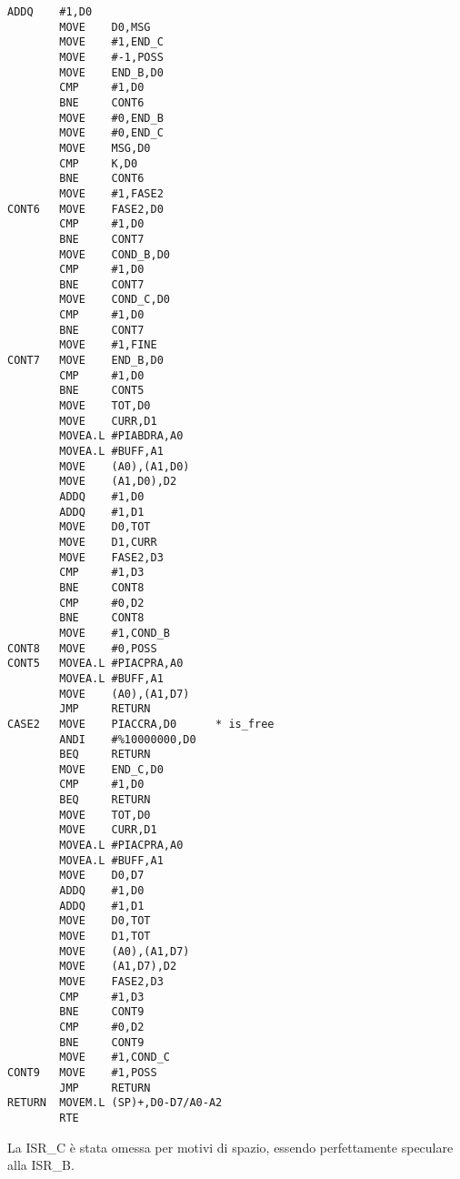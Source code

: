 \documentclass{article}
\begin{document}
\begin{lstlisting}[language=RISCAsm]
        ADDQ    #1,D0  
        MOVE    D0,MSG 
        MOVE    #1,END_C 
        MOVE    #-1,POSS 
        MOVE    END_B,D0 
        CMP     #1,D0 
        BNE     CONT6
        MOVE    #0,END_B
        MOVE    #0,END_C 
        MOVE    MSG,D0 
        CMP     K,D0
        BNE     CONT6
        MOVE    #1,FASE2 
CONT6   MOVE    FASE2,D0 
        CMP     #1,D0 
        BNE     CONT7
        MOVE    COND_B,D0 
        CMP     #1,D0 
        BNE     CONT7 
        MOVE    COND_C,D0 
        CMP     #1,D0 
        BNE     CONT7 
        MOVE    #1,FINE 
CONT7   MOVE    END_B,D0 
        CMP     #1,D0 
        BNE     CONT5 
        MOVE    TOT,D0 
        MOVE    CURR,D1 
        MOVEA.L #PIABDRA,A0
        MOVEA.L #BUFF,A1 
        MOVE    (A0),(A1,D0)
        MOVE    (A1,D0),D2
        ADDQ    #1,D0 
        ADDQ    #1,D1 
        MOVE    D0,TOT 
        MOVE    D1,CURR 
        MOVE    FASE2,D3 
        CMP     #1,D3
        BNE     CONT8 
        CMP     #0,D2 
        BNE     CONT8 
        MOVE    #1,COND_B 
CONT8   MOVE    #0,POSS 
CONT5   MOVEA.L #PIACPRA,A0 
        MOVEA.L #BUFF,A1 
        MOVE    (A0),(A1,D7)
        JMP     RETURN 
CASE2   MOVE    PIACCRA,D0      * is_free 
        ANDI    #%10000000,D0   
        BEQ     RETURN 
        MOVE    END_C,D0 
        CMP     #1,D0 
        BEQ     RETURN 
        MOVE    TOT,D0 
        MOVE    CURR,D1 
        MOVEA.L #PIACPRA,A0
        MOVEA.L #BUFF,A1 
        MOVE    D0,D7 
        ADDQ    #1,D0 
        ADDQ    #1,D1 
        MOVE    D0,TOT 
        MOVE    D1,TOT 
        MOVE    (A0),(A1,D7)
        MOVE    (A1,D7),D2 
        MOVE    FASE2,D3 
        CMP     #1,D3 
        BNE     CONT9
        CMP     #0,D2 
        BNE     CONT9
        MOVE    #1,COND_C
CONT9   MOVE    #1,POSS 
        JMP     RETURN 
RETURN  MOVEM.L (SP)+,D0-D7/A0-A2
        RTE 
\end{lstlisting}
\vspace{1\baselineskip}
La ISR\_C è stata omessa per motivi di spazio, essendo perfettamente speculare alla ISR\_B. 
\end{document}
